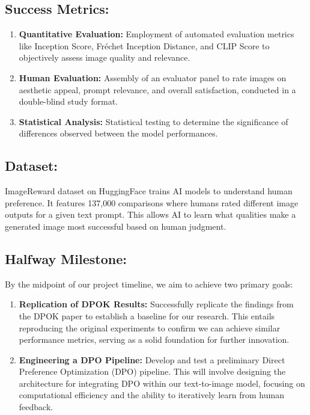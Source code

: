 \documentclass[12pt]{article}
\begin{document}
\subsection*{Success Metrics:}
\small\begin{enumerate}[label=\arabic*.]
    \vspace{-0.2cm}
    \item \textbf{Quantitative Evaluation:}
    Employment of automated evaluation metrics like Inception Score, Fréchet Inception Distance, and CLIP Score to objectively assess image quality and relevance.
    \vspace{-0.3cm}
    \item \textbf{Human Evaluation:}
    Assembly of an evaluator panel to rate images on aesthetic appeal, prompt relevance, and overall satisfaction, conducted in a double-blind study format.
    \vspace{-0.3cm}
    \item \textbf{Statistical Analysis:}
    Statistical testing to determine the significance of differences observed between the model performances.
\end{enumerate}
\vspace{-1cm}
\subsection*{Dataset:}
\vspace{-0.2cm}
ImageReward dataset on HuggingFace trains AI models to understand human preference. It features 137,000 comparisons where humans rated different image outputs for a given text prompt. This allows AI to learn what qualities make a generated image most successful based on human judgment.
\vspace{-0.5cm}
\subsection*{Halfway Milestone:}
\vspace{-0.2cm}
By the midpoint of our project timeline, we aim to achieve two primary goals:
\vspace{-0.4cm}
\begin{enumerate}
    \item \textbf{Replication of DPOK Results:} Successfully replicate the findings from the DPOK paper to establish a baseline for our research. This entails reproducing the original experiments to confirm we can achieve similar performance metrics, serving as a solid foundation for further innovation.
\vspace{-0.4cm}
    \item \textbf{Engineering a DPO Pipeline:} Develop and test a preliminary Direct Preference Optimization (DPO) pipeline. This will involve designing the architecture for integrating DPO within our text-to-image model, focusing on computational efficiency and the ability to iteratively learn from human feedback.
\end{enumerate}
\newpage
\end{document}
